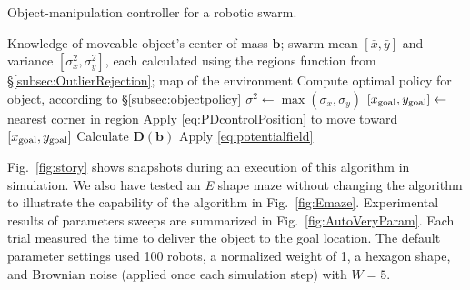 
\begin{algorithm}
\caption{Object-manipulation controller for a robotic swarm.}\label{alg:BlockPushing}
\begin{algorithmic}[1]
\Require Knowledge of moveable object's center of mass $\mathbf{b}$; swarm mean $[\bar{x},\bar{y}]$ and variance $[\sigma_x^2, \sigma_y^2]$, each calculated using the regions function from \S \ref{subsec:OutlierRejection};  map of the environment
\State Compute optimal policy for object, according to \S \ref{subsec:objectpolicy}
\State $\sigma^2 \gets \max{(\sigma_x,\sigma_y)}$
\State $ [x_{\rm{goal}}, y_{\rm{goal}}] \gets $ nearest corner in region
\State Apply \eqref{eq:PDcontrolPosition} to move toward $[x_{\rm{goal}}, y_{\rm{goal}}]$
\EndWhile
\Else  
\State Calculate $\mathbf{D}(\mathbf{b})$  
\State Apply \eqref{eq:potentialfield}   
\EndIf
\EndWhile
\end{algorithmic}
\end{algorithm}


Fig.~\ref{fig:story} shows snapshots during an execution of this algorithm in simulation.
 We also have tested an \emph{E} shape maze without changing the algorithm to illustrate the capability of the algorithm in Fig.~\ref{fig:Emaze}.
 Experimental results of parameters sweeps are summarized in Fig.~\ref{fig:AutoVeryParam}.  Each trial measured the time to deliver the object to the goal location.  The default parameter settings used 100 robots, a normalized weight of 1, a hexagon shape, and Brownian noise (applied once each simulation step) with $W=5$.  

